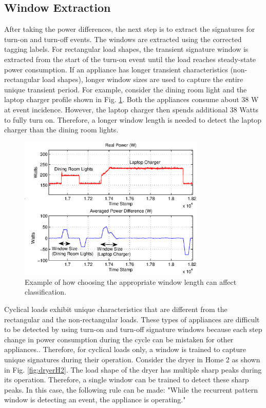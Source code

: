 \documentclass[conference]{IEEEtran}
\begin{document}
\subsection{Window Extraction}
After taking the power differences, the next step is to extract the signatures for turn-on  and turn-off events. The windows are extracted using the corrected tagging labels.  For rectangular load shapes, the transient signature window is extracted from the start of the turn-on event until the load reaches steady-state power consumption.  If an appliance has longer transient characteristics (non-rectangular load shapes), longer window sizes are used to capture the entire unique transient period.  For example, consider the dining room light and the laptop charger profile shown in Fig. \ref{fig:windowlength}.  Both the appliances consume about 38 W at event incidence.  However, the laptop charger then spends additional 38 Watts to fully turn on.  Therefore, a longer window length is needed to detect the laptop charger than the dining room lights. 

\begin{figure}[!t]
	\centering
	\includegraphics[width=3.5in]{fig/windowlength.eps}
	\caption{Example of how choosing the appropriate window length can affect classification.}
	\label{fig:windowlength}
\end{figure}

Cyclical loads exhibit unique characteristics that are different from the rectangular and the non-rectangular loads.  These types of appliances are difficult to be detected by using turn-on and turn-off signature windows because each step change in power consumption during the cycle can be mistaken for other appliances..  Therefore, for cyclical loads only, a window is trained to capture unique signatures during their operation.  Consider the dryer in Home 2 as shown in Fig. \ref{fig:dryerH2}.  The load shape of the dryer has multiple sharp peaks during its operation.  Therefore, a single window can be trained to detect these sharp peaks.  In this case, the following rule can be made:  "While the recurrent pattern window is detecting an event, the appliance is operating."  
\end{document}
